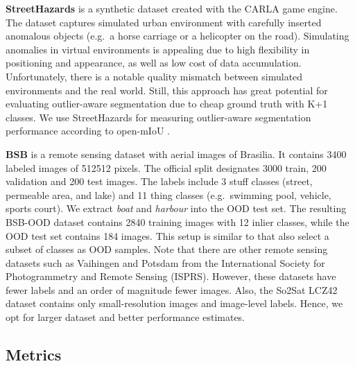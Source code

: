 \documentclass[lettersize,journal,hidelinks]{IEEEtran}
\begin{document}
\textbf{StreetHazards} \cite{hendrycks19arxiv} is a synthetic dataset created with the CARLA game engine.
The dataset captures simulated urban environment with carefully inserted anomalous objects (e.g.\ a horse carriage or a helicopter on the road).
Simulating anomalies in virtual environments is appealing due to high flexibility in positioning and appearance, as well as low cost of data accumulation.
Unfortunately, there is a notable quality mismatch between simulated environments and the real world.
Still, this approach has great potential for evaluating outlier-aware segmentation due to cheap ground truth with K+1 classes.
We use StreetHazards for measuring outlier-aware segmentation performance according to open-mIoU \cite{grcic22eccv}.


\textbf{BSB} \cite{carvalho22rs} is a remote sensing dataset with aerial images of Brasilia. 
It contains 3400 labeled images of 512512 pixels. 
The official split designates 3000 train, 200 validation and 200 test images.
The labels include 3 stuff classes (street, permeable area, and lake) 
and 11 thing classes (e.g.\ swimming pool, vehicle, sports court).
We extract \textit{boat} and \textit{harbour} into the OOD test set.
The resulting BSB-OOD dataset contains 2840 training images with 12 inlier classes, while the OOD test set contains 184 images.
This setup is similar to \cite{hendrycks19arxiv,grcic21visapp,vaze22icmlshw} that also select a subset of classes as OOD samples.
Note that there are other remote sensing datasets such as Vaihingen and Potsdam from the International Society for Photogrammetry and Remote Sensing (ISPRS).
However, these datasets have fewer labels and an order of magnitude fewer images.
Also, the So2Sat LCZ42 dataset \cite{zhu19arxiv} contains only small-resolution images and image-level labels.
Hence, we opt for larger dataset and better performance estimates.


\subsection{Metrics}
\label{sec:metrics}
\end{document}
